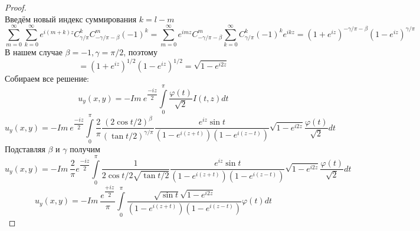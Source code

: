 \documentclass[12pt, a4paper]{extarticle}
\numberwithin{equation}{section}
\numberwithin{lemma}{section}
\numberwithin{definition}{section}
\numberwithin{notabene}{section}
\numberwithin{corollary}{section}
\begin{document}
\begin{proof}
\begin{equation*}
	\end{equation*}
	Введём новый индекс суммирования $k = l -m$
	\begin{equation*}
		\sum\limits_{m=0}^{\infty} \sum\limits_{k=0}^{\infty} e^{i(m+k)z} C^{k}_{\gamma/\pi} C^{m}_{-\gamma/\pi - \beta} (-1)^{k} = \sum\limits_{m=0}^{\infty} e^{imz} C^{m}_{-\gamma/\pi - \beta} \sum\limits_{k=0}^{\infty}  C^{k}_{\gamma/\pi} (-1)^k e^{ikz} = (1 + e^{iz})^{-\gamma/\pi - \beta} (1- e^{iz})^{\gamma/\pi} 
	\end{equation*}
	В нашем случае $\beta = -1, \gamma = \pi/2$, поэтому
	\begin{equation*}
		= (1 + e^{iz})^{1/2} (1- e^{iz})^{1/2} =\sqrt{1 - e^{i2z}} 
	\end{equation*}
	Собираем все решение:
	\begin{equation*}
		u_y(x,y) = - Im\ e^{\dfrac{-iz}{2}} \int\limits_0^\pi \dfrac{\varphi(t)}{\sqrt2} I(t,z) dt 
	\end{equation*}
	\begin{equation*}
	u_y(x,y) = - Im\ e^{\dfrac{-iz}{2}} \int\limits_0^\pi \dfrac{2}{\pi}\dfrac{(2\cos{t/2})^\beta}{(\tan{t/2})^{\gamma/\pi}}  \dfrac{e^{iz} \sin{t}}{\left(1 - e^{i(z+t)} \right) \left(1 - e^{i(z-t)}\right)} \sqrt{1 - e^{i2z}} \dfrac{\varphi(t)}{\sqrt2} dt
	\end{equation*}
	Подставляя $\beta$ и $\gamma$ получим
		\begin{equation*}
		u_y(x,y) = - Im\  \dfrac{2}{\pi} e^{\dfrac{-iz}{2}} \int\limits_0^\pi \dfrac{1}{2\cos{t/2} \sqrt{\tan{t/2}}}  \dfrac{e^{iz} \sin{t}}{\left(1 - e^{i(z+t)} \right) \left(1 - e^{i(z-t)}\right)} \sqrt{1 - e^{i2z}} \dfrac{\varphi(t)}{\sqrt2} dt
	\end{equation*}
	\begin{equation*}
	u_y(x,y) = - Im\  \dfrac{e^{\dfrac{+iz}{2}}}{\pi}  \int\limits_0^\pi  \dfrac{\sqrt{\sin{t}} \sqrt{1 - e^{i2z}}}{\left(1 - e^{i(z+t)} \right) \left(1 - e^{i(z-t)}\right)}  \varphi(t) dt
\end{equation*}
	\end{proof}
	\newpage
	
\end{document}
